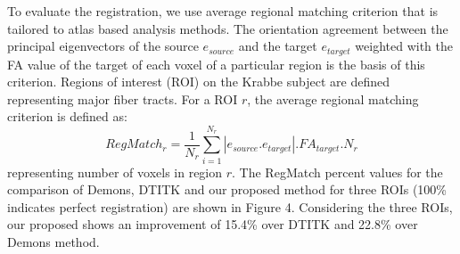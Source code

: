 \documentclass[]{spie}  %
\begin{document}
To evaluate the registration, we use average regional matching criterion that is tailored to atlas based analysis methods. The orientation agreement between the principal eigenvectors of the source $e_{source}$ and the target $e_{target}$ weighted with the FA value of the target of each voxel of a particular region is the basis of this criterion. Regions of interest (ROI) on the Krabbe subject are defined representing major fiber tracts. For a ROI $r$, the average regional matching criterion is defined as: 
\begin{equation}
RegMatch_{r} = \frac{1}{N_{r}} \sum_{i=1}^{N_{r}} |e_{source}.e_{target}|.FA_{target}. N_{r}
\end{equation}
 representing number of voxels in region $r$. The RegMatch percent values for the comparison of Demons, DTITK and our proposed method for three ROIs (100\% indicates perfect registration) are shown in Figure 4. Considering the three ROIs, our proposed shows an improvement of 15.4\% over DTITK and 22.8\% over Demons method. 
\end{document}
